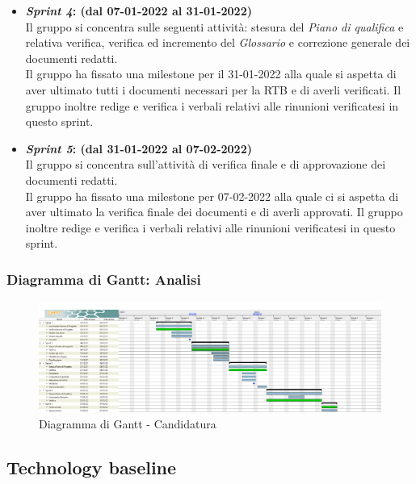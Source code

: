 \begin{itemize}
    \item \textbf{\textit{Sprint 4}: (dal 07-01-2022 al 31-01-2022)}\\
    Il gruppo si concentra sulle seguenti attività: stesura del \textit{Piano di qualifica} e relativa verifica, verifica ed incremento del \textit{Glossario} e correzione generale dei documenti redatti.\\
    Il gruppo ha fissato una milestone per il 31-01-2022 alla quale si aspetta di aver ultimato tutti i documenti necessari per la RTB e di averli verificati.
    Il gruppo inoltre redige e verifica i verbali relativi alle rinunioni verificatesi in questo sprint.

    \item \textbf{\textit{Sprint 5}: (dal 31-01-2022 al 07-02-2022)}\\
    Il gruppo si concentra sull'attività di verifica finale e di approvazione dei documenti redatti. \\
    Il gruppo ha fissato una milestone per 07-02-2022 alla quale ci si aspetta di aver ultimato la verifica finale dei documenti e di averli approvati.
    Il gruppo inoltre redige e verifica i verbali relativi alle rinunioni verificatesi in questo sprint.
\end{itemize}

\subsubsection{Diagramma di Gantt: Analisi}
\begin{figure}[h!]
    \centering
    \includegraphics[scale=0.22]{../../assets/Diagrammi_Gantt/Analisi.png}
    \caption{Diagramma di Gantt - Candidatura}
\end{figure}

\newpage
\subsection{Technology baseline}
